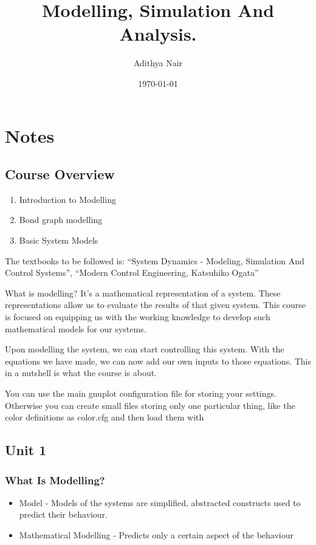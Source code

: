 \documentclass[11pt]{report}
\author{Adithya Nair}
\date{\today}
\title{Modelling, Simulation And Analysis.}
\begin{document}
\maketitle
\tableofcontents

\part{Notes}
\label{sec:orgf6da297}
\chapter{Course Overview}
\label{sec:org1285dcc}
\begin{enumerate}
\item Introduction to Modelling
\item Bond graph modelling
\item Basic System Models
\end{enumerate}

The textbooks to be followed is: ``System Dynamics - Modeling, Simulation And Control Systems'', ``Modern Control Engineering, Katsuhiko Ogata''

What is modelling? It's a mathematical representation of a system. These representations allow us to evaluate the results of that given system. This course is focused on equipping us with the working knowledge to develop such mathematical models for our systems.

Upon modelling the system, we can start controlling this system. With the equations we have made, we can now add our own inputs to those equations. This in a nutshell is what the course is about.

You can use the main gnuplot configuration file for storing your settings. Otherwise you can create small files storing only one particular thing, like the color definitions as color.cfg and then load them with
\chapter{Unit 1}
\label{sec:orgc3eaf94}
\section{What Is Modelling?}
\label{sec:org02760a4}
\begin{itemize}
\item Model - Models of the systems are simplified, abstracted constructs used to predict their behaviour.
\item Mathematical Modelling - Predicts only a certain aspect of the behaviour
\end{itemize}
\end{document}
